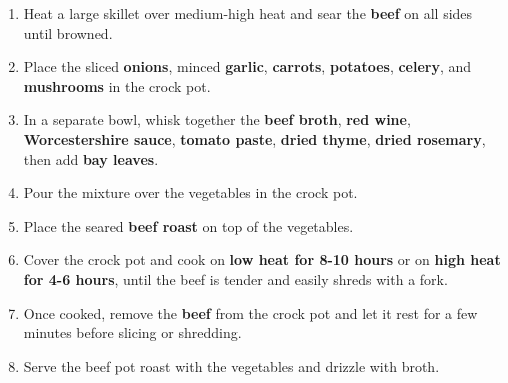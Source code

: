 \documentclass[11pt,letterpaper]{article}
\begin{document}
\begin{enumerate}
    \item Heat a large skillet over medium-high heat and sear the \textbf{beef} on all sides until browned.
    \item Place the sliced \textbf{onions}, minced \textbf{garlic}, \textbf{carrots}, \textbf{potatoes}, \textbf{celery}, and \textbf{mushrooms} in the crock pot.
    \item In a separate bowl, whisk together the \textbf{beef broth}, \textbf{red wine}, \textbf{Worcestershire sauce}, \textbf{tomato paste}, \textbf{dried thyme}, \textbf{dried rosemary}, then add \textbf{bay leaves}.
    \item Pour the mixture over the vegetables in the crock pot.
    \item Place the seared \textbf{beef roast} on top of the vegetables.
    \item Cover the crock pot and cook on \textbf{low heat for 8-10 hours} or on \textbf{high heat for 4-6 hours}, until the beef is tender and easily shreds with a fork.
    \item Once cooked, remove the \textbf{beef} from the crock pot and let it rest for a few minutes before slicing or shredding.
    \item Serve the beef pot roast with the vegetables and drizzle with broth.
\end{enumerate}
\end{document}
